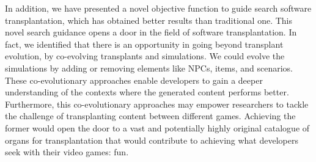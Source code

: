 In addition, we have presented a novel objective function to guide search software transplantation, which has obtained better results than traditional one. This novel search guidance opens a door in the field of software transplantation.
In fact, we identified that there is an opportunity in going beyond transplant evolution, by co-evolving transplants and simulations. We could evolve the simulations by adding or removing elements like NPCs, items, and scenarios. These co-evolutionary approaches enable developers to gain a deeper understanding of the contexts where the generated content performs better. Furthermore, this co-evolutionary approaches may empower researchers to tackle the challenge of transplanting content between different games. Achieving the former would open the door to a vast and potentially highly original catalogue of organs for transplantation that would contribute to achieving what developers seek with their video games: fun.